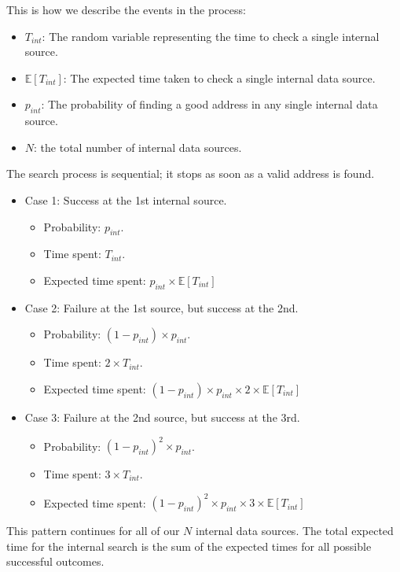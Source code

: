 \documentclass{article}
\begin{document}
This is how we describe the events in the process:

\begin{itemize}
    \item $T_{int}$: The random variable representing the time to check a single internal source.
    \item $\mathbb{E}\left[ T_{int} \right]$: The expected time taken to check a single internal data source.
    \item $p_{int}$: The probability of finding a good address in any single internal data source.
    \item $N$: the total number of internal data sources.
\end{itemize}

The search process is sequential; it stops as soon as a valid address is found.

\begin{itemize}
    \item Case 1: Success at the 1st internal source.
    \begin{itemize}
        \item Probability: $p_{int}$.
        \item Time spent: $T_{int}$.
        \item Expected time spent: $p_{int} \times \mathbb{E}\left[T_{int}\right]$ 
    \end{itemize}
    \item Case 2: Failure at the 1st source, but success at the 2nd.
    \begin{itemize}
        \item Probability: $\left(1 - p_{int} \right) \times p_{int}$.
        \item Time spent: $2 \times T_{int}$.
        \item Expected time spent: $\left(1 - p_{int}\right) \times p_{int} \times 2 \times \mathbb{E}\left[T_{int}\right]$
    \end{itemize}
    \item Case 3: Failure at the 2nd source, but success at the 3rd.
    \begin{itemize}
        \item Probability: $\left(1 - p_{int} \right)^{2} \times p_{int}$.
        \item Time spent: $3 \times T_{int}$.
        \item Expected time spent: $\left(1 - p_{int}\right)^{2} \times p_{int} \times 3 \times \mathbb{E}\left[T_{int}\right]$
    \end{itemize}
\end{itemize}
This pattern continues for all of our $N$ internal data sources. The total expected time for the internal search is the sum of the expected times for all possible successful outcomes.
\end{document}
